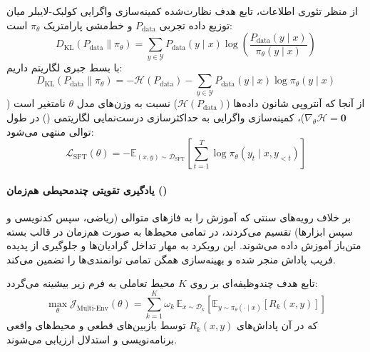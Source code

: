 از منظر تئوری اطلاعات، تابع هدف نظارت‌شده کمینه‌سازی واگرایی کولبک-لایبلر میان توزیع داده تجربی $P_{\text{data}}$ و خط‌مشی پارامتریک $\pi_\theta$ است:
\begin{equation}
    D_{\mathrm{KL}}(P_{\text{data}} \parallel \pi_\theta) = \sum_{y \in \mathcal{Y}} P_{\text{data}}(y \mid x) \log \left( \frac{P_{\text{data}}(y \mid x)}{\pi_\theta(y \mid x)} \right)
\end{equation}
با بسط جبری لگاریتم داریم:
\begin{equation}
    D_{\mathrm{KL}}(P_{\text{data}} \parallel \pi_\theta) = - \mathcal{H}(P_{\text{data}}) - \sum_{y \in \mathcal{Y}} P_{\text{data}}(y \mid x) \log \pi_\theta(y \mid x)
\end{equation}
از آنجا که آنتروپی شانون داده‌ها ($\mathcal{H}(P_{\text{data}})$) نسبت به وزن‌های مدل $\theta$ نامتغیر است ($\nabla_\theta \mathcal{H} = \mathbf{0}$)، کمینه‌سازی واگرایی به حداکثرسازی درست‌نمایی لگاریتمی () در طول توالی منتهی می‌شود:
\begin{equation}
    \mathcal{L}_{\mathrm{SFT}}(\theta) = - \mathbb{E}_{(x, y) \sim \mathcal{D}_{\mathrm{SFT}}} \left[ \sum_{t=1}^T \log \pi_\theta(y_t \mid x, y_{<t}) \right]
\end{equation}

\paragraph*{یادگیری تقویتی چندمحیطی هم‌زمان ()}
بر خلاف رویه‌های سنتی که آموزش را به فازهای متوالی (ریاضی، سپس کدنویسی و سپس ابزارها) تقسیم می‌کردند، در  تمامی محیط‌ها به صورت هم‌زمان در قالب بسته متن‌باز  آموزش داده می‌شوند. این رویکرد به مهار تداخل گرادیان‌ها و جلوگیری از پدیده فریب پاداش منجر شده و بهینه‌سازی همگن تمامی توانمندی‌ها را تضمین می‌کند.

تابع هدف چندوظیفه‌ای بر روی $K$ محیط تعاملی به فرم زیر بیشینه می‌گردد:
\begin{equation}
    \max_\theta \mathcal{J}_{\text{Multi-Env}}(\theta) = \sum_{k=1}^K \omega_k \, \mathbb{E}_{x \sim \mathcal{D}_k} \left[ \mathbb{E}_{y \sim \pi_\theta(\cdot \mid x)} \left[ R_k(x, y) \right] \right]
\end{equation}
که در آن پاداش‌های $R_k(x, y)$ توسط بازبین‌های قطعی و محیط‌های واقعی برنامه‌نویسی و استدلال ارزیابی می‌شوند.

